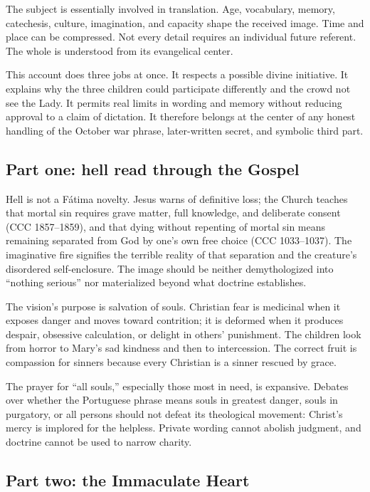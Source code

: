 The subject is essentially involved in translation. Age, vocabulary, memory, catechesis, culture, imagination, and capacity shape the received image. Time and place can be compressed. Not every detail requires an individual future referent. The whole is understood from its evangelical center.

This account does three jobs at once. It respects a possible divine initiative. It explains why the three children could participate differently and the crowd not see the Lady. It permits real limits in wording and memory without reducing approval to a claim of dictation. It therefore belongs at the center of any honest handling of the October war phrase, later-written secret, and symbolic third part.

\subsection{Part one: hell read through the Gospel}

Hell is not a Fátima novelty. Jesus warns of definitive loss; the Church teaches that mortal sin requires grave matter, full knowledge, and deliberate consent (CCC 1857--1859), and that dying without repenting of mortal sin means remaining separated from God by one's own free choice (CCC 1033--1037). The imaginative fire signifies the terrible reality of that separation and the creature's disordered self-enclosure. The image should be neither demythologized into “nothing serious” nor materialized beyond what doctrine establishes.

The vision's purpose is salvation of souls. Christian fear is medicinal when it exposes danger and moves toward contrition; it is deformed when it produces despair, obsessive calculation, or delight in others' punishment. The children look from horror to Mary's sad kindness and then to intercession. The correct fruit is compassion for sinners because every Christian is a sinner rescued by grace.

The prayer for “all souls,” especially those most in need, is expansive. Debates over whether the Portuguese phrase means souls in greatest danger, souls in purgatory, or all persons should not defeat its theological movement: Christ's mercy is implored for the helpless. Private wording cannot abolish judgment, and doctrine cannot be used to narrow charity.

\subsection{Part two: the Immaculate Heart}

